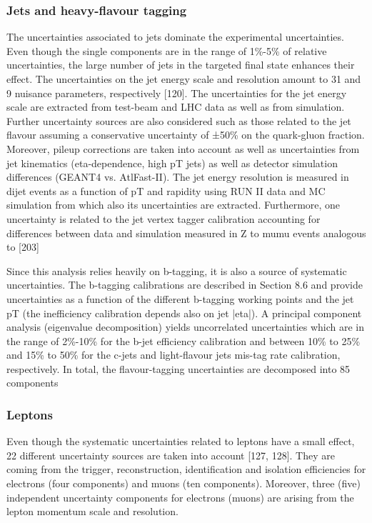 \subsubsection{Jets and heavy-flavour tagging}
The uncertainties associated to jets dominate the experimental uncertainties. Even though the single components are in the range of 1\%-5\% of relative uncertainties, the large number of jets in the targeted final state enhances their effect. The uncertainties on the jet energy scale and resolution amount to 31 and 9 nuisance parameters, respectively [120]. The uncertainties for the jet energy scale are extracted from test-beam and LHC data as well as from simulation. Further uncertainty sources are also considered such as those related to the jet flavour assuming a conservative uncertainty of ±50\%
on the quark-gluon fraction. Moreover, pileup corrections are taken into account as well as uncertainties from jet kinematics (eta-dependence, high pT jets) as well as detector simulation differences (GEANT4 vs. AtlFast-II). The jet energy resolution is measured in dijet events as a function of pT and rapidity using RUN II data and MC simulation from which also its uncertainties are extracted. Furthermore, one uncertainty is related to the jet vertex tagger calibration accounting for differences between data and simulation measured in Z to mumu events analogous to [203]

Since this analysis relies heavily on b-tagging, it is also a source of systematic uncertainties. The b-tagging calibrations are described in Section 8.6 and provide uncertainties as a function of the different b-tagging working points and the jet pT (the inefficiency calibration depends also on jet |eta|). A principal component analysis (eigenvalue decomposition) yields uncorrelated uncertainties which are in the range of 2\%-10\% for the b-jet efficiency calibration and between 10\% to 25\% and
15\% to 50\% for the c-jets and light-flavour jets mis-tag rate calibration, respectively. In total, the flavour-tagging uncertainties are decomposed into 85 components


\subsubsection{Leptons}
Even though the systematic uncertainties related to leptons have a small effect, 22 different uncertainty sources are taken into account [127, 128]. They are coming from the trigger, reconstruction, identification and isolation efficiencies for electrons (four components) and muons (ten components). Moreover, three (five) independent uncertainty components for electrons (muons) are arising from the lepton momentum scale and resolution.

